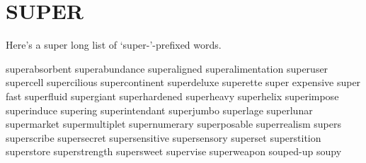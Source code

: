 \section{SUPER}
Here's a super long list of `super-'-prefixed words.

superabsorbent
superabundance
superaligned
superalimentation
superuser
supercell
supercilious
supercontinent
superdeluxe
superette
super expensive
super fast
superfluid
supergiant
superhardened
superheavy
superhelix
superimpose
superinduce
supering
superintendant
superjumbo
superlage
superlunar
supermarket
supermultiplet
supernumerary
superposable
superrealism
supers
superscribe
supersecret
supersensitive
supersensory
superset
superstition
superstore
superstrength
supersweet
supervise
superweapon
souped-up
soupy
